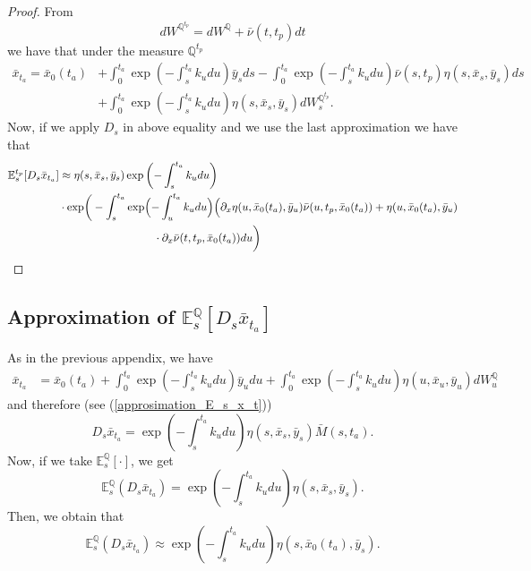 \documentclass[a4paper,10pt]{article}
\newcommand{\1}{\mathbf{1}}
\begin{document}
\begin{proof}
From 
\begin{equation*}
dW^{\mathbb{Q}^{t_p}} = dW^{\mathbb{Q}} + \bar{\nu}(t,t_p) dt
\end{equation*}
we have that under the measure $\mathbb{Q}^{t_p}$ 
\begin{align*}
\bar{x}_{t_a} = \bar{x}_0(t_a) &+ \int_{0}^{t_a} \exp\left(-\int_{s}^{t_a}k_u du\right) \bar{y}_s ds - \int_{0}^{t_a} \exp\left(-\int_{s}^{t_a}k_u du\right) \bar{\nu}(s, t_p) \eta(s,\bar{x}_s,\bar{y}_s) ds   \\
&+ \int_{0}^{t_a}  \exp\left(-\int_{s}^{t_a}k_u du \right)\eta(s,\bar{x}_s,\bar{y}_s) dW_s^{\mathbb{Q}^{t_p}}. 
\end{align*}
Now, if we apply $D_s$ in above equality and we use the last approximation we have that
\begin{align*}
\mathbb{E}^{t_p}_s[D_s \bar{x}_{t_a}] &\approx \eta(s,\bar{x}_s,\bar{y}_s) \exp\left(-\int_{s}^{t_a}k_u du \right)\\ &\cdot \exp\biggr(-\int_{s}^{t_a} \exp\Bigl(-\int_{u}^{t_a}k_u du\Bigr) \Bigl(\partial_x \eta(u, \bar{x}_0(t_a), \bar{y}_{u}) \bar{\nu}(u,t_p, \bar{x}_0(t_a)) + \eta(u,\bar{x}_0(t_a), \bar{y}_{u}) \\
\qquad &\hspace{3cm} \cdot \partial_x \bar{\nu} (t,t_p, \bar{x}_0(t_a)) du\biggr)
\end{align*}
\end{proof}

\subsection{Approximation of $\mathbb{E}_s^{\mathbb{Q}}\left[D_s \bar{x}_{t_a}\right]$}
As in the previous appendix, we have
\begin{align*}
\bar{x}_{t_a} &= \bar{x}_0(t_a) + \int_{0}^{t_a} \exp\left(-\int_{s}^{t_a}k_u du\right) \bar{y}_u du + \int_{0}^{t_a} \exp\left(-\int_{s}^{t_a}k_u du \right) \eta(u,\bar{x}_u,\bar{y}_u) dW_u^{\mathbb{Q}}
\end{align*}
and therefore (see (\ref{approsimation_E_s_x_t}))
\begin{equation}
D_s \bar{x}_{t_a} =  \exp\left(-\int_{s}^{t_a}k_u du \right) \eta(s,\bar{x}_s,\bar{y}_{s})\bar{M}(s,t_a).
\end{equation}
Now, if we take $\mathbb{E}_s^{\mathbb{Q}}\left[\cdot\right]$, we get
\begin{equation}\label{approximation_spot_E_s_x_t}
\mathbb{E}^{\mathbb{Q}}_s\left(D_s \bar{x}_{t_a} \right)=\exp\left(-\int_{s}^{t_a}k_u du \right) \eta(s,\bar{x}_s,\bar{y}_{s}).
\end{equation}
Then, we obtain that
\begin{equation}\label{approximation_spot_E_s_x_t}
\mathbb{E}^{\mathbb{Q}}_s\left(D_s \bar{x}_{t_a} \right) \approx \exp\left(-\int_{s}^{t_a}k_u du \right) \eta(s,\bar{x}_0(t_a),\bar{y}_{s}).
\end{equation}
\end{document}
